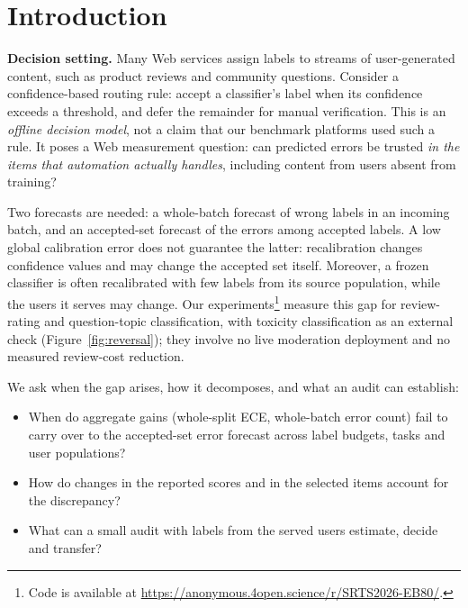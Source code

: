\documentclass[sigconf,anonymous,review]{acmart}
\begin{document}
\section{Introduction}
\textbf{Decision setting.} Many Web services assign labels to streams of
user-generated content, such as product reviews and community questions.
Consider a confidence-based routing rule: accept a classifier's label when
its confidence exceeds a threshold, and defer the remainder for manual
verification. This is an \emph{offline decision model}, not a claim that
our benchmark platforms used such a rule. It poses a Web measurement
question: can predicted errors be trusted \emph{in the items
that automation actually handles}, including content from users absent
from training?

Two forecasts are needed: a whole-batch forecast of wrong labels in an
incoming batch, and an accepted-set forecast of the errors among
accepted labels. A low global
calibration error does not guarantee the latter: recalibration changes
confidence values and may change the accepted set itself. Moreover, a frozen classifier is
often recalibrated with few labels from its source population,
while the users it serves may change. Our experiments\footnote{Code is available at
\url{https://anonymous.4open.science/r/SRTS2026-EB80/}.} measure this gap
for review-rating and question-topic classification, with toxicity
classification as an external check (Figure~\ref{fig:reversal}); they involve no live moderation deployment
and no measured review-cost reduction.

We ask when the gap arises, how it decomposes, and what an audit can
establish:
\begin{itemize}
\item[\textbf{RQ1}] When do aggregate gains (whole-split ECE, whole-batch
error count) fail to carry over to the accepted-set error forecast across
label budgets, tasks and user populations?
\item[\textbf{RQ2}] How do changes in the reported scores and in the
selected items account for the discrepancy?
\item[\textbf{RQ3}] What can a small audit with labels from the served
users estimate, decide and transfer?
\end{itemize}
\end{document}
